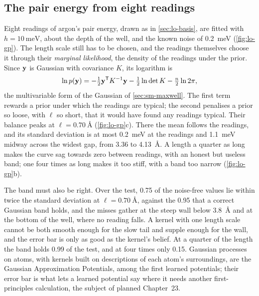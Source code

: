 \subsection*{The pair energy from eight readings}

Eight readings of argon's pair energy, drawn as in \cref{sec:lo-basis},
are fitted with $h = \SI{10}{\milli\electronvolt}$, about the depth of the
well, and the known noise of \SI{0.2}{\milli\electronvolt}
(\cref{fig:lo-gp}). The length scale still has to be chosen, and the
readings themselves choose it through their \emph{marginal likelihood},
the density of the readings under the prior. Since $\bm{\mathrm{y}}$ is Gaussian
with covariance $K$, its logarithm is
\begin{equation*}
   \ln p(\bm{\mathrm{y}}) = -\tfrac12\bm{\mathrm{y}}^{\mathsf T}K^{-1}\bm{\mathrm{y}}
   - \tfrac12\ln\det K - \tfrac n2\ln2\pi ,
\end{equation*}
the multivariable form of the Gaussian of \cref{sec:sm-maxwell}. The
first term rewards a prior under which the readings are typical; the
second penalises a prior so loose, with $\ell$ so short, that it would
have found any readings typical. Their balance peaks at $\ell =
\SI{0.70}{\angstrom}$ (\cref{fig:lo-gp}c). There the mean follows the
readings, and its standard deviation is at most
\SI{0.2}{\milli\electronvolt} at the readings and
\SI{1.1}{\milli\electronvolt} midway across the widest gap, from 3.36 to
\SI{4.13}{\angstrom}. A length a quarter as long makes the curve sag
towards zero between readings, with an honest but useless band; one four
times as long makes it too stiff, with a band too narrow
(\cref{fig:lo-gp}b).

The band must also be right. Over the test, \num{0.75} of the noise-free
values lie within twice the standard deviation at $\ell =
\SI{0.70}{\angstrom}$, against the 0.95 that a correct Gaussian band
holds, and the misses gather at the steep wall below \SI{3.8}{\angstrom}
and at the bottom of the well, where no reading falls. A kernel with one
length scale cannot be both smooth enough for the slow tail and supple
enough for the wall, and the error bar is only as good as the kernel's
belief. At a quarter of the length the band holds 0.99 of the test, and
at four times only 0.15. Gaussian processes on atoms, with kernels built
on descriptions of each atom's surroundings, are the Gaussian
Approximation Potentials\cite{Bartok2010}, among the first learned
potentials; their error bar is what lets a learned potential say where
it needs another first-principles calculation, the subject of
planned Chapter~23.

